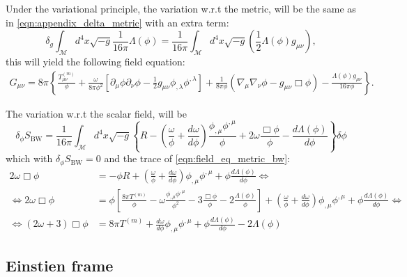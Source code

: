 Under the variational principle, the variation w.r.t the metric, will be the same as in \cref{eqn:appendix_delta_metric} with an extra term:
\begin{equation}
    \delta_g \int_{\mathcal{M}}d^4x\sqrt{-g}\frac{1}{16\pi}\Lambda(\phi) = \frac{1}{16\pi}\int_{\mathcal{M}}d^4x\sqrt{-g}\left(\frac{1}{2}\Lambda(\phi)g_{\mu\nu}\right),
\end{equation}
this will yield the following field equation:
\begin{align}
G_{\mu\nu}=8\pi\left\{\frac{T_{\mu\nu}^{(m)}}{\phi}+\frac{\omega}{8\pi\phi^2}\left[\partial_\mu \phi \partial_\nu \phi-\frac{1}{2}g_{\mu\nu}\phi_{,\lambda}\phi^{,\lambda}\right]+\frac{1}{8\pi\phi}\left(\nabla_\mu\nabla_\nu\phi-g_{\mu\nu}\Box\phi\right)-\frac{\Lambda(\phi)g_{\mu\nu}}{16\pi\phi}\right\}.
\label{eqn:field_eq_metric_bw}
\end{align}

The variation w.r.t the scalar field, will be
\begin{equation}
    \delta_\phi S_{\mathrm{BW}}=\frac{1}{16\pi}\int_{\mathcal{M}} d^4x\sqrt{-g}\left\{ R-\left(\frac{\omega}{\phi}+\frac{d\omega}{d\phi}\right)\frac{\phi_{,\mu}\phi^{,\mu}}{\phi}+2\omega\frac{\Box\phi}{\phi}-\frac{d\Lambda(\phi)}{d\phi}\right\}\delta\phi
    \label{eqn:delta_phi_bw}
\end{equation}
which with $\delta_\phi S_{\mathrm{BW}}=0$ and the trace of \cref{eqn:field_eq_metric_bw}:
\begin{align}
    2\omega\Box\phi&=-\phi R+\left(\frac{\omega}{\phi}+\frac{d\omega}{d\phi}\right)\phi_{,\mu}\phi^{,\mu}+\phi\frac{d\Lambda(\phi)}{d\phi}\Leftrightarrow\nonumber\\
    \Leftrightarrow 2\omega\Box\phi&=\phi\left[\frac{8\pi T^{(m)}}{\phi}-\omega\frac{\phi_{,\mu}\phi^{,\mu}}{\phi^2}-3\frac{\Box\phi}{\phi}-2\frac{\Lambda(\phi)}{\phi}\right]+\left(\frac{\omega}{\phi}+\frac{d\omega}{d\phi}\right)\phi_{,\mu}\phi^{,\mu}+\phi\frac{d\Lambda(\phi)}{d\phi}\Leftrightarrow\nonumber\\
    \Leftrightarrow (2\omega+3)\Box\phi &=8\pi T^{(m)}+\frac{d\omega}{d\phi}\phi_{,\mu}\phi^{,\mu}+\phi\frac{d\Lambda(\phi)}{d\phi}-2\Lambda(\phi)
\end{align}




\subsection{Einstien frame}

